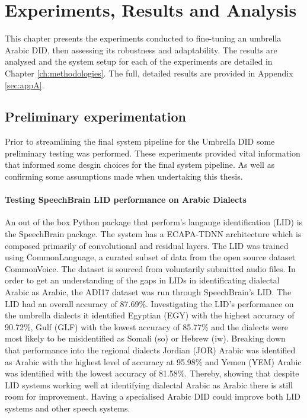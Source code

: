 
\chapter{Experiments, Results and Analysis}\label{ch:experiment}
This chapter presents the experiments conducted to fine-tuning an umbrella Arabic DID, then assessing 
its robustness and adaptability. The results are analysed and the system setup for each of the experiments are detailed in Chapter \ref{ch:methodologies}. 
The full, detailed results are provided in Appendix \ref{sec:appA}. 

\section{Preliminary experimentation}
Prior to streamlining the final system pipeline for the Umbrella DID some preliminary testing was performed. These 
experiments provided vital information that informed some desgin choices for the final system pipeline. As well as confirming 
some assumptions made when undertaking this thesis. 
\subsubsection*{Testing SpeechBrain LID performance on Arabic Dialects}
An out of the box Python package that perform's langauge identification (LID) is the SpeechBrain package. 
The system has a ECAPA-TDNN architecture which is composed primarily of convolutional and residual layers. The 
LID was trained using CommonLanguage, a curated subset of data from the open source dataset CommonVoice. The dataset is sourced 
from voluntarily submitted audio files. In order to get an understanding of the gaps in LIDs in identificating dialectal Arabic as Arabic, 
the ADI17 dataset was run through SpeechBrain's LID. The LID had an overall accuracy of 87.69\%.
Investigating the LID's performance on the umbrella dialects it identified Egyptian (EGY) with the highest accuracy of 90.72\%, 
Gulf (GLF) with the lowest accuracy of 85.77\% and the dialects were most likely to be misidentified as Somali (so) or Hebrew (iw). 
Breaking down that performance into the regional dialects Jordian (JOR) Arabic was identified as Arabic with the highest level of accuracy at 95.98\% and  
Yemen (YEM) Arabic was identified with the lowest accuracy of 81.58\%. Thereby, showing that despite LID systems working well at identifying dialectal Arabic as Arabic there is still room for improvement. Having a specialised Arabic DID could improve 
both LID systems and other speech systems. 

